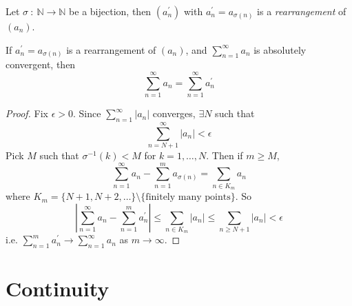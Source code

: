 \documentclass[10pt, a4paper, twoside]{report}
\begin{document}
\begin{definition}
    Let \(\sigma\::\:\mathbb{N}\to\mathbb{N}\) be a bijection, then \((a_n^\prime)\) with \(a_n^\prime=a_{\sigma(n)}\) is a \emph{rearrangement} of \((a_n)\).
\end{definition}
\begin{theorem}
    If \(a_n^\prime=a_{\sigma(n)}\) is a rearrangement of \((a_n)\), and \(\sum_{n=1}^\infty a_n\) is absolutely convergent, then
    \[\sum_{n=1}^\infty a_n=\sum_{n=1}^\infty a_n^\prime\]
\end{theorem}
\begin{proof}
    Fix \(\epsilon>0\). Since \(\sum_{n=1}^\infty |a_n|\) converges, \(\exists N\) such that
    \[\sum_{n=N+1}^\infty |a_n|<\epsilon\]
    Pick \(M\) such that \(\sigma^{-1}(k)<M\) for \(k=1,\ldots,N\). Then if \(m\geq M\),
    \[\sum_{n=1}^\infty a_n-\sum_{n=1}^m a_{\sigma(n)}=\sum_{n\in K_m}a_n\]
    where \(K_m=\{N+1,N+2,\ldots\}\setminus\{\text{finitely many points}\}\). So
    \[\left|\sum_{n=1}^\infty a_n-\sum_{n=1}^m a_n^\prime\right|\leq\sum_{n\in K_m}|a_n|\leq\sum_{n\geq N+1}|a_n|<\epsilon\]
    i.e. \(\sum_{n=1}^{m}a_n^\prime\to\sum_{n=1}^{\infty}a_n\) as \(m\to\infty\).
\end{proof}
\section{Continuity}
\end{document}
